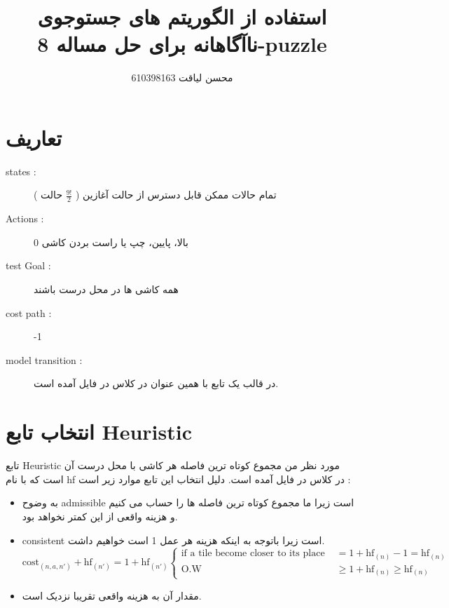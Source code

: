 \documentclass{article}
\title{استفاده از الگوریتم های جستوجوی ناآگاهانه برای حل مساله 8-puzzle}
\author{محسن لیاقت 610398163}
\begin{document}
	\maketitle
    \tableofcontents
    
    \section{تعاریف}
        \begin{description}
        	\item[states : ] تمام حالات ممکن قابل دسترس از حالت آغازین 
        	( $\frac{9!}{2}$ حالت )
        	\item[Actions : ] بالا، پایین، چپ یا راست  بردن کاشی 0
        	\item[ test Goal :] همه کاشی ها در محل درست باشند
        	\item[cost path :] -1
        	\item[model transition :] در قالب یک تابع با همین عنوان در کلاس  در فایل  آمده است.
        \end{description}
    \section{انتخاب تابع Heuristic}
        تابع Heuristic مورد نظر من مجموع کوتاه ترین فاصله هر کاشی با محل درست آن است که با نام hf در کلاس  در فایل  آمده است.
        دلیل انتخاب این تابع موارد زیر است : 
        \begin{itemize}
        	\item به وضوح admissible است زیرا ما مجموع کوتاه ترین فاصله ها را حساب می کنیم و هزینه واقعی از این کمتر نخواهد بود. 
        	\item consistent است زیرا باتوجه به اینکه هزینه هر عمل 1 است خواهیم داشت.
        	\[ 
        	\textrm{cost}_{( n , a , n' )} + \textrm{hf}_{( n' )} = 1 + \textrm{hf}_{( n' )} 
        	\begin{cases}
        		\textrm{if a tile become closer to its place } & = 1 + \textrm{hf}_{( n )} - 1  = \textrm{hf}_{( n )} \\
        		\textrm{O.W} & \geqslant 1 + \textrm{hf}_{( n )} \geqslant \textrm{hf}_{( n )}
        	\end{cases}
        	\]
        	\item مقدار آن به هزینه واقعی تقریبا نزدیک است.
        \end{itemize} 
\end{document}
